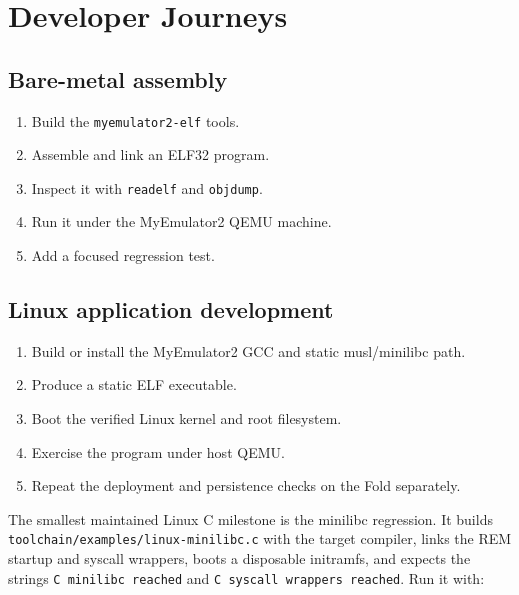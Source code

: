 \documentclass[
  oneside,
  openany]{book}
\providecommand{\tightlist}{%
  \setlength{\itemsep}{0pt}\setlength{\parskip}{0pt}}
\begin{document}
\hypertarget{developer-journeys}{%
\chapter{Developer Journeys}\label{developer-journeys}}

\hypertarget{bare-metal-assembly}{%
\section{Bare-metal assembly}\label{bare-metal-assembly}}

\begin{enumerate}
\def\labelenumi{\arabic{enumi}.}
\tightlist
\item
  Build the \texttt{myemulator2-elf} tools.
\item
  Assemble and link an ELF32 program.
\item
  Inspect it with \texttt{readelf} and \texttt{objdump}.
\item
  Run it under the MyEmulator2 QEMU machine.
\item
  Add a focused regression test.
\end{enumerate}

\hypertarget{linux-application-development}{%
\section{Linux application
development}\label{linux-application-development}}

\begin{enumerate}
\def\labelenumi{\arabic{enumi}.}
\tightlist
\item
  Build or install the MyEmulator2 GCC and static musl/minilibc path.
\item
  Produce a static ELF executable.
\item
  Boot the verified Linux kernel and root filesystem.
\item
  Exercise the program under host QEMU.
\item
  Repeat the deployment and persistence checks on the Fold separately.
\end{enumerate}

The smallest maintained Linux C milestone is the minilibc regression. It
builds \texttt{toolchain/examples/linux-minilibc.c} with the target
compiler, links the REM startup and syscall wrappers, boots a disposable
initramfs, and expects the strings \texttt{C\ minilibc\ reached} and
\texttt{C\ syscall\ wrappers\ reached}. Run it with:
\end{document}
